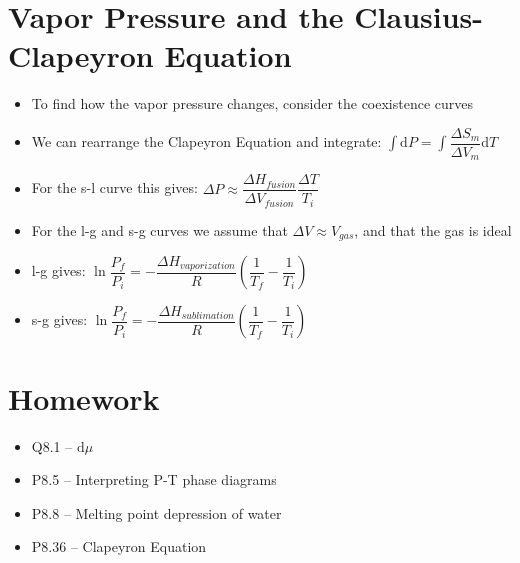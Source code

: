 \documentclass[12pt, openany, letterpaper]{memoir}
\begin{document}
\section*{Vapor Pressure and the Clausius-Clapeyron Equation}
\begin{itemize}
	\item To find how the vapor pressure changes, consider the coexistence curves
	\item We can rearrange the Clapeyron Equation and integrate: $\int\!\mathrm{d}P = \int\!\dfrac{\Delta S_m}{\Delta V_m}\mathrm{d}T$
	\item For the s-l curve this gives: $\Delta P \approx \dfrac{\Delta H_{fusion}}{\Delta V_{fusion}}\dfrac{\Delta T}{T_i}$
	\item For the l-g and s-g curves we assume that $\Delta V \approx V_{gas}$, and that the gas is ideal
	\item l-g gives: $\ln\dfrac{P_f}{P_i} = -\dfrac{\Delta H_{vaporization}}{R}\left(\dfrac{1}{T_f}-\dfrac{1}{T_i}\right)$
	\item s-g gives: $\ln\dfrac{P_f}{P_i} = -\dfrac{\Delta H_{sublimation}}{R}\left(\dfrac{1}{T_f}-\dfrac{1}{T_i}\right)$
\end{itemize}
\section*{Homework}
\begin{itemize}
	\item Q8.1 -- $\mathrm{d}\mu$
	\item P8.5 -- Interpreting P-T phase diagrams
	\item P8.8 -- Melting point depression of water
	\item P8.36 -- Clapeyron Equation
\end{itemize}
\end{document}
